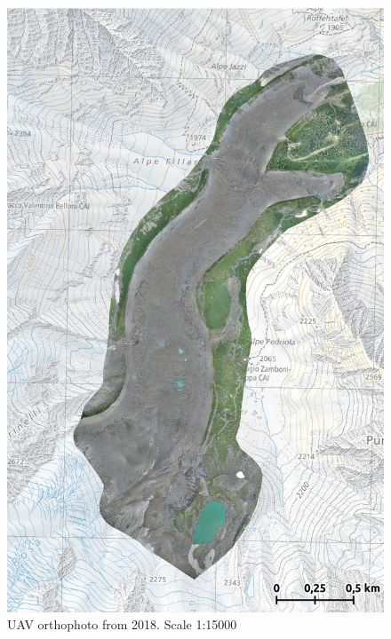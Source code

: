 \begin{figure}[p]
    \centering
    \includegraphics[width=\textwidth]{figures/appendix/orto_2018.jpg}
    \caption{UAV orthophoto from 2018. Scale 1:15000}
\end{figure}

